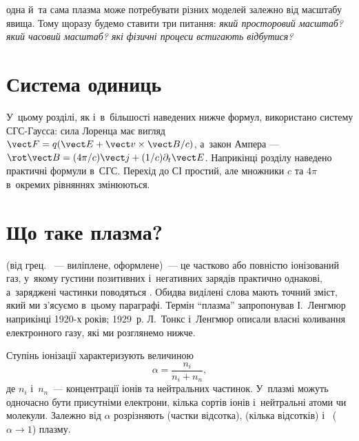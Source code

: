  одна й~та сама плазма може потребувати різних моделей
залежно від масштабу явища. Тому щоразу будемо ставити три питання: \emph{який просторовий
масштаб? який часовий масштаб? які фізичні процеси встигають відбутися?}



\section{Система одиниць}



У~цьому розділі, як і~в~більшості наведених нижче формул, використано систему СГС-Гаусса:
сила Лоренца має вигляд $\vect F=q(\vect E+\vect v\times\vect B/c)$, а~закон Ампера ---
$\rot\vect B=(4\pi/c)\vect j+(1/c)\partial_t\vect E$. Наприкінці розділу наведено
практичні формули в~СГС. Перехід до СІ простий, але множники $c$ та $4\pi$ в~окремих
рівняннях змінюються.



\section{Що таке плазма?}



 (від грец. ~--- виліплене, оформлене)~--- це частково або
повністю іонізований газ, у~якому густини позитивних і~негативних зарядів практично
однакові, а~заряджені частинки поводяться . Обидва виділені слова мають
точний зміст, який ми з'ясуємо в~цьому параграфі. Термін \enquote{плазма} запропонував
І.~Ленгмюр наприкінці 1920-х років; 1929~р. Л.~Тонкс і~Ленгмюр описали власні коливання
електронного газу, які ми розглянемо нижче.

Ступінь іонізації характеризують величиною
\begin{equation}\label{eq:ionization-degree}
	\alpha = \frac{n_i}{n_i + n_n},
\end{equation}
де $n_i$ і~$n_n$~--- концентрації іонів та нейтральних частинок. У~плазмі можуть одночасно
бути присутніми електрони, кілька сортів іонів і~нейтральні атоми чи молекули. Залежно від
$\alpha$ розрізняють  (частки відсотка),  (кілька відсотків) і~ ($\alpha\to1$) плазму.

